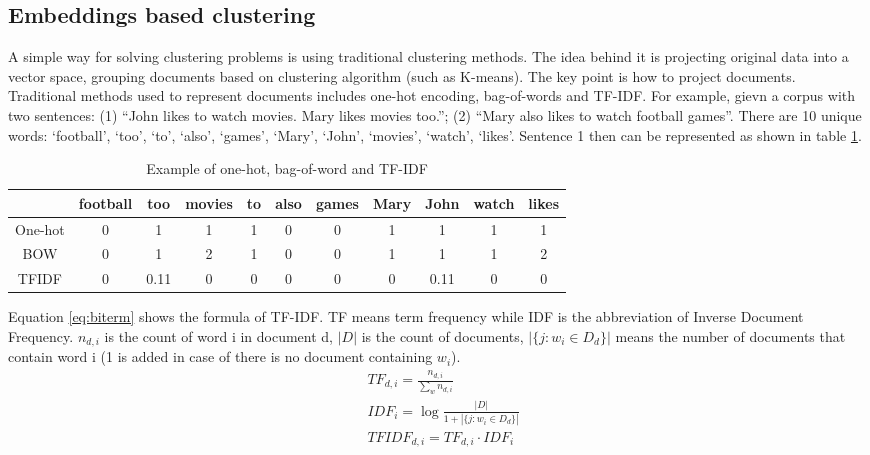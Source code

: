 \subsection{Embeddings based clustering}
\label{sec:Document vector}
A simple way for solving clustering problems is using traditional clustering methods. The idea behind it is projecting original data into a vector space, grouping documents based on clustering algorithm (such as K-means). The key point is how to project documents. Traditional methods used to represent documents includes one-hot encoding, bag-of-words and TF-IDF. For example, gievn a corpus with two sentences: (1) ``John likes to watch movies. Mary likes movies too.''; (2) ``Mary also likes to watch football games''. There are 10 unique words: `football', `too', `to', `also', `games', `Mary', `John', `movies', `watch', `likes'. Sentence 1 then can be represented as shown in table \ref{tab:bow1}.
\begin{table}[!htbp]
    \centering
    \hspace{0.5cm}
    \begin{tabular}{|c|c|c|c|c|c|c|c|c|c|c|}
        \hline
         & football & too & movies & to & also & games & Mary & John & watch & likes \\ \hline
         One-hot & 0 & 1 & 1 & 1 & 0 & 0 & 1 & 1 & 1 & 1 \\\hline
         BOW & 0 & 1 & 2 & 1 & 0 & 0 & 1 & 1 & 1 & 2 \\\hline
         TFIDF & 0 & 0.11 & 0 & 0 & 0 & 0 & 0 & 0.11 & 0 & 0 \\\hline
    \end{tabular}
    \caption{Example of one-hot, bag-of-word and TF-IDF}
    \label{tab:bow1}
\end{table}
Equation \ref{eq:biterm} shows the formula of TF-IDF. TF means term frequency while IDF is the abbreviation of Inverse Document Frequency. $n_{d,i}$ is the count of word i in document d, $|D|$ is the count of documents, $|\{j: w_i \in D_d\}|$ means the number of documents that contain word i (1 is added in case of there is no document containing $w_i$).
\begin{equation}
    \begin{aligned}
        &TF_{d,i} = \frac{n_{d,i}}{\sum_wn_{d,i}}\\
        &IDF_{i} = \log\frac{|D|}{1 + |\{j: w_i \in D_d\}|} \\
        &TFIDF_{d,i} = TF_{d,i} \cdot IDF_{i}
    \end{aligned} 
    \label{eq:tfidf}
\end{equation}
